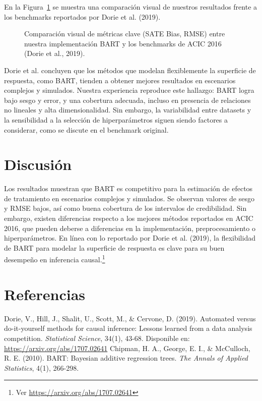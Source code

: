\documentclass[a4paper,12pt]{article}
\begin{document}
\noindent En la Figura~\ref{fig:comparacion_bart_acic} se muestra una comparación visual de nuestros resultados frente a los benchmarks reportados por Dorie et al. (2019).

\begin{figure}[h!]
    \centering
    \caption{Comparación visual de métricas clave (SATE Bias, RMSE) entre nuestra implementación BART y los benchmarks de ACIC 2016 (Dorie et al., 2019).}
    \label{fig:comparacion_bart_acic}
\end{figure}

Dorie et al. concluyen que los métodos que modelan flexiblemente la superficie de respuesta, como BART, tienden a obtener mejores resultados en escenarios complejos y simulados. Nuestra experiencia reproduce este hallazgo: BART logra bajo sesgo y error, y una cobertura adecuada, incluso en presencia de relaciones no lineales y alta dimensionalidad. Sin embargo, la variabilidad entre datasets y la sensibilidad a la selección de hiperparámetros siguen siendo factores a considerar, como se discute en el benchmark original.

\section{Discusión}
Los resultados muestran que BART es competitivo para la estimación de efectos de tratamiento en escenarios complejos y simulados. Se observan valores de sesgo y RMSE bajos, así como buena cobertura de los intervalos de credibilidad. Sin embargo, existen diferencias respecto a los mejores métodos reportados en ACIC 2016, que pueden deberse a diferencias en la implementación, preprocesamiento o hiperparámetros. En línea con lo reportado por Dorie et al. (2019), la flexibilidad de BART para modelar la superficie de respuesta es clave para su buen desempeño en inferencia causal.\footnote{Ver \url{https://arxiv.org/abs/1707.02641}}

\section{Referencias}
\begin{thebibliography}{9}
 Dorie, V., Hill, J., Shalit, U., Scott, M., \& Cervone, D. (2019). Automated versus do-it-yourself methods for causal inference: Lessons learned from a data analysis competition. \textit{Statistical Science}, 34(1), 43-68. Disponible en: \url{https://arxiv.org/abs/1707.02641}
 Chipman, H. A., George, E. I., \& McCulloch, R. E. (2010). BART: Bayesian additive regression trees. \textit{The Annals of Applied Statistics}, 4(1), 266-298.
\end{thebibliography}
\end{document}
